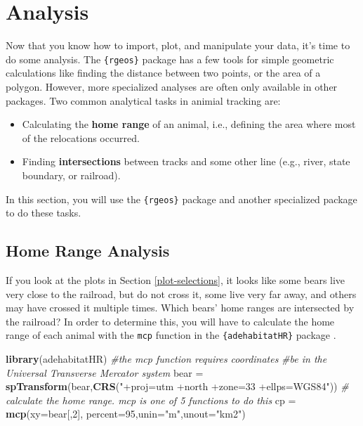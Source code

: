 \documentclass[]{book}
\newenvironment{Shaded}{\begin{snugshade}}{\end{snugshade}}
\newcommand{\CommentTok}[1]{\textcolor[rgb]{0.56,0.35,0.01}{\textit{#1}}}
\newcommand{\DataTypeTok}[1]{\textcolor[rgb]{0.13,0.29,0.53}{#1}}
\newcommand{\DecValTok}[1]{\textcolor[rgb]{0.00,0.00,0.81}{#1}}
\newcommand{\KeywordTok}[1]{\textcolor[rgb]{0.13,0.29,0.53}{\textbf{#1}}}
\newcommand{\NormalTok}[1]{#1}
\newcommand{\StringTok}[1]{\textcolor[rgb]{0.31,0.60,0.02}{#1}}
\providecommand{\tightlist}{%
  \setlength{\itemsep}{0pt}\setlength{\parskip}{0pt}}
\begin{document}
\hypertarget{Anal}{%
\section{Analysis}\label{Anal}}

Now that you know how to import, plot, and manipulate your data, it's time to do some analysis. The \texttt{\{rgeos\}} package \citep{R-rgeos} has a few tools for simple geometric calculations like finding the distance between two points, or the area of a polygon. However, more specialized analyses are often only available in other packages. Two common analytical tasks in animial tracking are:

\begin{itemize}
\tightlist
\item
  Calculating the \textbf{home range} of an animal, i.e., defining the area where most of the relocations occurred.
\item
  Finding \textbf{intersections} between tracks and some other line (e.g., river, state boundary, or railroad).
\end{itemize}

In this section, you will use the \texttt{\{rgeos\}} package and another specialized package to do these tasks.

\hypertarget{hr-Anal}{%
\subsection{Home Range Analysis}\label{hr-Anal}}

If you look at the plots in Section \ref{plot-selections}, it looks like some bears live very close to the railroad, but do not cross it, some live very far away, and others may have crossed it multiple times. Which bears' home ranges are intersected by the railroad? In order to determine this, you will have to calculate the home range of each animal with the \texttt{mcp} function in the \texttt{\{adehabitatHR\}} package \citep{R-adehabitatHR}.

\begin{Shaded}
\begin{Highlighting}[]
\KeywordTok{library}\NormalTok{(adehabitatHR) }
\CommentTok{#the mcp function requires coordinates }
\CommentTok{#be in the Universal Transverse Mercator system}
\NormalTok{bear =}\StringTok{ }\KeywordTok{spTransform}\NormalTok{(bear,}\KeywordTok{CRS}\NormalTok{(}\StringTok{"+proj=utm +north +zone=33 +ellps=WGS84"}\NormalTok{))}
\CommentTok{# calculate the home range. mcp is one of 5 functions to do this}
\NormalTok{cp =}\StringTok{ }\KeywordTok{mcp}\NormalTok{(}\DataTypeTok{xy=}\NormalTok{bear[,}\DecValTok{2}\NormalTok{], }\DataTypeTok{percent=}\DecValTok{95}\NormalTok{,}\DataTypeTok{unin=}\StringTok{"m"}\NormalTok{,}\DataTypeTok{unout=}\StringTok{"km2"}\NormalTok{) }
\end{Highlighting}
\end{Shaded}
\end{document}
